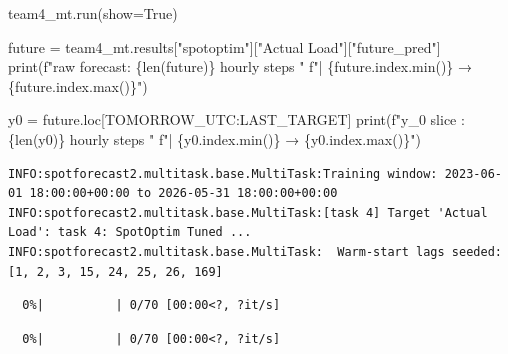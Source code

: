 \documentclass[
  english,
  letterpaper,
]{scrbook}
\newenvironment{Shaded}{\begin{snugshade}}{\end{snugshade}}
\newcommand{\BuiltInTok}[1]{\textcolor[rgb]{0.00,0.23,0.31}{#1}}
\newcommand{\NormalTok}[1]{\textcolor[rgb]{0.00,0.23,0.31}{#1}}
\newcommand{\OperatorTok}[1]{\textcolor[rgb]{0.37,0.37,0.37}{#1}}
\newcommand{\SpecialCharTok}[1]{\textcolor[rgb]{0.37,0.37,0.37}{#1}}
\newcommand{\SpecialStringTok}[1]{\textcolor[rgb]{0.13,0.47,0.30}{#1}}
\newcommand{\StringTok}[1]{\textcolor[rgb]{0.13,0.47,0.30}{#1}}
\newcommand{\VariableTok}[1]{\textcolor[rgb]{0.07,0.07,0.07}{#1}}
\begin{document}
\protect{}\label{team4-train}
\begin{Shaded}
\begin{Highlighting}[]
\NormalTok{team4\_mt.run(show}\OperatorTok{=}\VariableTok{True}\NormalTok{)}

\NormalTok{future }\OperatorTok{=}\NormalTok{ team4\_mt.results[}\StringTok{"spotoptim"}\NormalTok{][}\StringTok{"Actual Load"}\NormalTok{][}\StringTok{"future\_pred"}\NormalTok{]}
\BuiltInTok{print}\NormalTok{(}\SpecialStringTok{f"raw forecast: }\SpecialCharTok{\{}\BuiltInTok{len}\NormalTok{(future)}\SpecialCharTok{\}}\SpecialStringTok{ hourly steps "}
      \SpecialStringTok{f"| }\SpecialCharTok{\{}\NormalTok{future}\SpecialCharTok{.}\NormalTok{index}\SpecialCharTok{.}\BuiltInTok{min}\NormalTok{()}\SpecialCharTok{\}}\SpecialStringTok{ → }\SpecialCharTok{\{}\NormalTok{future}\SpecialCharTok{.}\NormalTok{index}\SpecialCharTok{.}\BuiltInTok{max}\NormalTok{()}\SpecialCharTok{\}}\SpecialStringTok{"}\NormalTok{)}

\NormalTok{y0 }\OperatorTok{=}\NormalTok{ future.loc[TOMORROW\_UTC:LAST\_TARGET]}
\BuiltInTok{print}\NormalTok{(}\SpecialStringTok{f"y\_0 slice   : }\SpecialCharTok{\{}\BuiltInTok{len}\NormalTok{(y0)}\SpecialCharTok{\}}\SpecialStringTok{ hourly steps "}
      \SpecialStringTok{f"| }\SpecialCharTok{\{}\NormalTok{y0}\SpecialCharTok{.}\NormalTok{index}\SpecialCharTok{.}\BuiltInTok{min}\NormalTok{()}\SpecialCharTok{\}}\SpecialStringTok{ → }\SpecialCharTok{\{}\NormalTok{y0}\SpecialCharTok{.}\NormalTok{index}\SpecialCharTok{.}\BuiltInTok{max}\NormalTok{()}\SpecialCharTok{\}}\SpecialStringTok{"}\NormalTok{)}
\end{Highlighting}
\end{Shaded}

\begin{verbatim}
INFO:spotforecast2.multitask.base.MultiTask:Training window: 2023-06-01 18:00:00+00:00 to 2026-05-31 18:00:00+00:00
INFO:spotforecast2.multitask.base.MultiTask:[task 4] Target 'Actual Load': task 4: SpotOptim Tuned ...
INFO:spotforecast2.multitask.base.MultiTask:  Warm-start lags seeded: [1, 2, 3, 15, 24, 25, 26, 169]
\end{verbatim}

\protect{}\label{team4-train-1}
\begin{verbatim}
  0%|          | 0/70 [00:00<?, ?it/s]
\end{verbatim}

\protect{}\label{team4-train-2}
\begin{verbatim}
  0%|          | 0/70 [00:00<?, ?it/s]
\end{verbatim}
\end{document}
